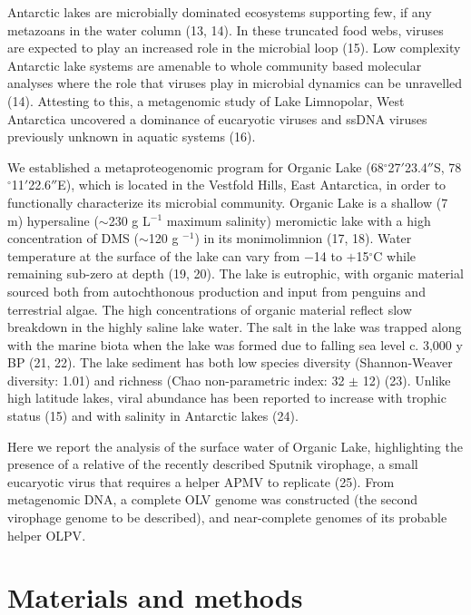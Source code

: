 Antarctic lakes are microbially dominated ecosystems supporting few, if any metazoans in the water column (13, 14). 
In these truncated food webs, viruses are expected to play an increased role in the microbial loop (15). 
Low complexity Antarctic lake systems are amenable to whole community based molecular analyses where the role that viruses play in microbial dynamics can be unravelled (14). 
Attesting to this, a metagenomic study of Lake Limnopolar, West Antarctica uncovered a dominance of eucaryotic viruses and ss\textsc{DNA} viruses previously unknown in aquatic systems (16). 

We established a metaproteogenomic program for Organic Lake (68$^{\circ}$27$'$23.4$''$S, 78$^{\circ}$11$'$22.6$''$E), which is located in the Vestfold Hills, East Antarctica, in order to functionally characterize its microbial community. 
Organic Lake is a shallow (7 m) hypersaline ($\sim$230 g L$^{-1}$ maximum salinity) meromictic lake with a high concentration of \ac{DMS} ($\sim$120 \textmu{}g $^{-1}$) in its monimolimnion (17, 18). 
Water temperature at the surface of the lake can vary from $-$14 to $+$15$^{\circ}$C while remaining sub-zero at depth (19, 20). 
The lake is eutrophic, with organic material sourced both from autochthonous production and input from penguins and terrestrial algae. 
The high concentrations of organic material reflect slow breakdown in the highly saline lake water. 
The salt in the lake was trapped along with the marine biota when the lake was formed due to falling sea level c. 3,000 y BP (21, 22). The lake sediment has both low species diversity (Shannon-Weaver diversity: 1.01) and richness (Chao non-parametric index: 32 $\pm$ 12) (23). 
Unlike high latitude lakes, viral abundance has been reported to increase with trophic status (15) and with salinity in Antarctic lakes (24). 

Here we report the analysis of the surface water of Organic Lake, highlighting the presence of a relative of the recently described Sputnik virophage, a small eucaryotic virus that requires a helper \ac{APMV} to replicate (25). 
From metagenomic DNA, a complete \ac{OLV} genome was constructed (the second virophage genome to be described), and near-complete genomes of its probable helper \ac{OLPV}.


\section{Materials and methods}


